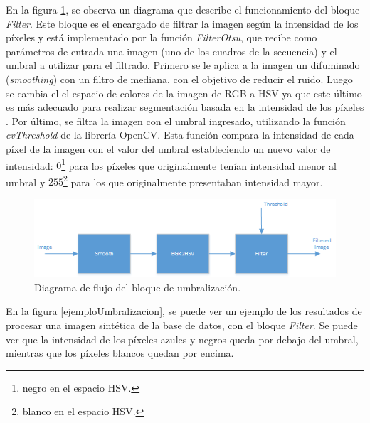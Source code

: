 En la figura \ref{diagramaumbralizacion}, se observa un diagrama que describe el funcionamiento del bloque \emph{Filter}. Este bloque es el encargado de filtrar la imagen según la intensidad de los píxeles y está implementado por la función \emph{FilterOtsu}, que recibe como parámetros de entrada una imagen (uno de los cuadros de la secuencia) y el umbral a utilizar para el filtrado. Primero se le aplica a la imagen un difuminado (\textit{smoothing}) con un filtro de mediana, con el objetivo de reducir el ruido. Luego se cambia el el espacio de colores de la imagen de RGB a HSV ya que este último es más adecuado para realizar segmentación basada en la intensidad de los píxeles \cite{HSV}. Por último, se filtra la imagen con el umbral ingresado, utilizando la función \emph{cvThreshold} de la librería OpenCV. Esta función compara la intensidad de cada píxel de la imagen con el valor del umbral estableciendo un nuevo valor de intensidad: $0$\footnote{negro en el espacio HSV.} para los píxeles que originalmente tenían intensidad menor al umbral y $255$\footnote{blanco en el espacio HSV.} para los que originalmente presentaban intensidad mayor.

\begin{figure}[ht!]
\begin{center}
\includegraphics[scale=0.7]{img/diagrama_umbralizacion.png}
\end{center}
\caption{Diagrama de flujo del bloque de umbralización.}
\label{diagramaumbralizacion}
\end{figure}

En la figura \ref{ejemploUmbralizacion}, se puede ver un ejemplo de los resultados de procesar una imagen sintética de la base de datos, con el bloque \emph{Filter}. Se puede ver que la intensidad de los píxeles azules y negros queda por debajo del umbral, mientras que los píxeles blancos quedan por encima. %

